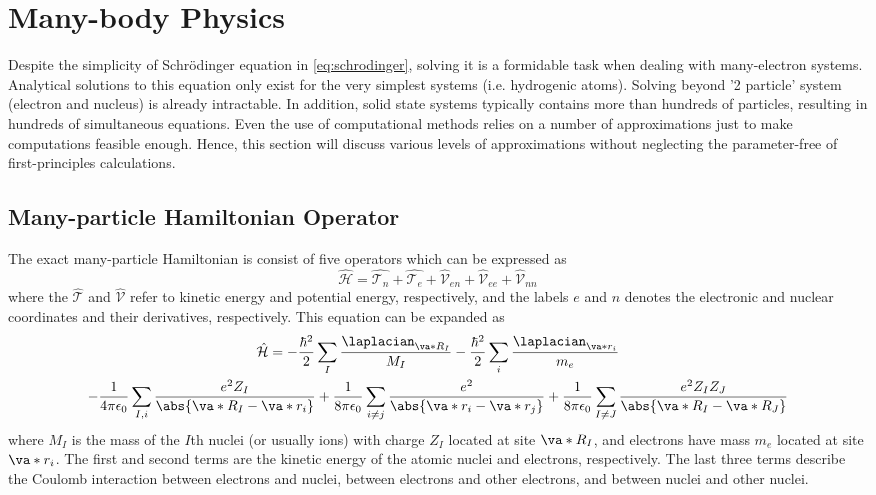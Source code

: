 \section{Many-body Physics}
Despite the simplicity of Schr\"{o}dinger equation in \eqref{eq:schrodinger}, solving it is a formidable task when dealing with many-electron systems. Analytical solutions to this equation only exist for the very simplest systems (i.e. hydrogenic atoms). Solving beyond '2 particle' system (electron and nucleus) is already intractable. In addition, solid state systems typically contains more than hundreds of particles, resulting in hundreds of simultaneous equations. Even the use of computational methods relies on a number of approximations just to make computations feasible enough. Hence, this section will discuss various levels of approximations without neglecting the parameter-free of first-principles calculations. 

   \subsection{Many-particle Hamiltonian Operator}
The exact many-particle Hamiltonian is consist of five operators which can be expressed as 
\begin{equation}
    \hat{\mathcal{H}} = \hat{\mathcal{T}_n} + \hat{\mathcal{T}_e} + \hat{\mathcal{V}}_{en} + \hat{\mathcal{V}}_{ee}  + \hat{\mathcal{V}}_{nn} 
\end{equation}
where the $\hat{\mathcal{T}}$ and $\hat{\mathcal{V}}$ refer to kinetic energy and potential energy, respectively, and the labels $e$ and $n$ denotes the electronic and nuclear coordinates and their derivatives, respectively.  This equation can be expanded as 
\begin{multline} \label{eq:many_se}
    \hat{\mathcal{H}}  = - \frac{\hbar^2}{2} \sum_I \frac{\laplacian_{\va*{R_I}}}{M_I} - \frac{\hbar^2}{2} \sum_i \frac{\laplacian_{\va*{r_i}}}{m_e} \\
    - \frac{1}{4 \pi \epsilon_0} \sum_{I,i} \frac{e^2 Z_I}{\abs{\va*{R_I} - \va*{r_i}}} + \frac{1}{8 \pi \epsilon_0} \sum_{i\neq j} \frac{e^2}{\abs{\va*{r_i} - \va*{r_j}}} + \frac{1}{8 \pi \epsilon_0} \sum_{I\neq J} \frac{e^2 Z_I Z_J}{\abs{\va*{R_I} - \va*{R_J}}} 
\end{multline}
where $M_I$ is the mass of the $I$th nuclei (or usually ions) with charge $Z_I$ located at site $\va*{R_I}$, and electrons have mass $m_e$  located at site $\va*{r_i}$. The first and second terms are the kinetic energy of the atomic nuclei and electrons, respectively. The last three terms
describe the Coulomb interaction between electrons and nuclei, between electrons and other electrons, and between nuclei and other nuclei. 

